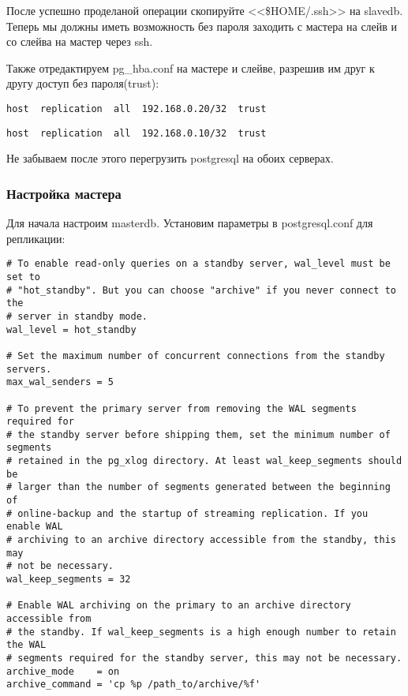 После успешно проделаной операции скопируйте <<\$HOME/.ssh>> на slavedb. 
Теперь мы должны иметь возможность без пароля заходить с мастера на слейв и со слейва на мастер через ssh.

Также отредактируем pg\_hba.conf на мастере и слейве, разрешив им друг к другу доступ без пароля(trust):
\begin{lstlisting}[label=lst:streaming7,caption=Мастер pg\_hba.conf]
host  replication  all  192.168.0.20/32  trust
\end{lstlisting}
\begin{lstlisting}[label=lst:streaming8,caption=Слейв pg\_hba.conf]
host  replication  all  192.168.0.10/32  trust
\end{lstlisting}

Не забываем после этого перегрузить postgresql на обоих серверах.

\subsubsection{Настройка мастера}
Для начала настроим masterdb. Установим параметры в postgresql.conf для репликации:
\begin{lstlisting}[label=lst:streaming9,caption=Настройка мастера]
# To enable read-only queries on a standby server, wal_level must be set to
# "hot_standby". But you can choose "archive" if you never connect to the
# server in standby mode.
wal_level = hot_standby

# Set the maximum number of concurrent connections from the standby servers.
max_wal_senders = 5

# To prevent the primary server from removing the WAL segments required for
# the standby server before shipping them, set the minimum number of segments
# retained in the pg_xlog directory. At least wal_keep_segments should be
# larger than the number of segments generated between the beginning of
# online-backup and the startup of streaming replication. If you enable WAL
# archiving to an archive directory accessible from the standby, this may
# not be necessary.
wal_keep_segments = 32

# Enable WAL archiving on the primary to an archive directory accessible from
# the standby. If wal_keep_segments is a high enough number to retain the WAL
# segments required for the standby server, this may not be necessary.
archive_mode    = on
archive_command = 'cp %p /path_to/archive/%f'
\end{lstlisting}

